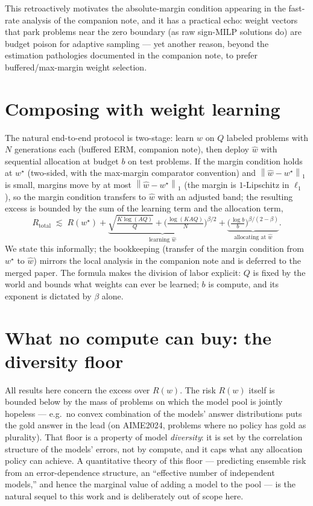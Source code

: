 \documentclass[11pt]{article}
\newcommand{\what}{\widehat w}
\newcommand{\wstar}{w^\star}
\newcommand{\wfix}{w}
\newcommand{\norm}[1]{\left\lVert #1\right\rVert}
\begin{document}
This retroactively motivates the absolute-margin condition appearing in the
fast-rate analysis of the companion note, and it has a practical echo: weight
vectors that park problems near the zero boundary (as raw sign-MILP
solutions do) are budget poison for adaptive sampling --- yet another reason,
beyond the estimation pathologies documented in the companion note, to
prefer buffered/max-margin weight selection.

\section{Composing with weight learning}
\label{sec:compose}

The natural end-to-end protocol is two-stage: learn $\what$ on $Q$ labeled
problems with $N$ generations each (buffered ERM, companion note), then
deploy $\what$ with sequential allocation at budget $b$ on test problems.
If the margin condition holds at $\wstar$ (two-sided, with the max-margin
comparator convention) and $\norm{\what-\wstar}_1$ is small, margins move by
at most $\norm{\what-\wstar}_1$ (the margin is $1$-Lipschitz in $\ell_1$),
so the margin condition transfers to $\what$ with an adjusted band; the
resulting excess is bounded by the sum of the learning term and the
allocation term,
\[
R_{\mathrm{total}}
\;\lesssim\;
R(\wstar)
+\underbrace{\sqrt{\tfrac{K\log(AQ)}{Q}}
+\Big(\tfrac{\log(KAQ)}{N}\Big)^{\beta/2}}_{\text{learning }\what}
+\underbrace{\Big(\tfrac{\log b}{b}\Big)^{\beta/(2-\beta)}}_{\text{allocating at }\what}.
\]
We state this informally; the bookkeeping (transfer of the margin condition
from $\wstar$ to $\what$) mirrors the local analysis in the companion note
and is deferred to the merged paper.  The formula makes the division of
labor explicit: $Q$ is fixed by the world and bounds what weights can ever
be learned; $b$ is compute, and its exponent is dictated by $\beta$ alone.

\section{What no compute can buy: the diversity floor}
\label{sec:floor}

All results here concern the excess over $R(\wfix)$.  The risk $R(\wfix)$
itself is bounded below by the mass of problems on which the model pool is
jointly hopeless --- e.g.\ no convex combination of the models' answer
distributions puts the gold answer in the lead (on AIME2024, problems where
no policy has gold as plurality).  That floor is a property of model
\emph{diversity}: it is set by the correlation structure of the models'
errors, not by compute, and it caps what any allocation policy can achieve.
A quantitative theory of this floor --- predicting ensemble risk from an
error-dependence structure, an ``effective number of independent models,''
and hence the marginal value of adding a model to the pool --- is the natural
sequel to this work and is deliberately out of scope here.
\end{document}
